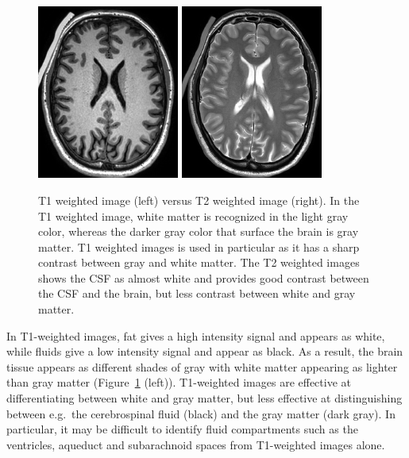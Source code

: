 \begin{figure}
  \centering
  \includegraphics[width=0.415\textwidth]{./chapters/chp2/FIG/T1-image.png}
  \includegraphics[width=0.415\textwidth]{./chapters/chp2/FIG/T2-image.png}
  \caption{T1 weighted image (left) versus T2 weighted image (right).
    In the T1 weighted image, white matter is recognized in the light
    gray color, whereas the darker gray color that surface the brain
    is gray matter. T1 weighted images is used in particular as it has
    a sharp contrast between gray and white matter.  The T2 weighted
    images shows the CSF as almost white and provides good contrast
    between the CSF and the brain, but less contrast between white and
    gray matter.}
  \label{fig:chp2:t1vt2}
\end{figure}
In T1-weighted images, fat gives a high intensity signal and appears
as white, while fluids give a low intensity signal and appear as
black. As a result, the brain tissue appears as different shades of
gray with white matter appearing as lighter than gray matter
(Figure~\ref{fig:chp2:t1vt2} (left)). T1-weighted images are effective
at differentiating between white and gray matter, but less effective
at distinguishing between e.g.~the cerebrospinal fluid (black) and the
gray matter (dark gray). In particular, it may be difficult to
identify fluid compartments such as the ventricles, aqueduct and
subarachnoid spaces from T1-weighted images alone.

